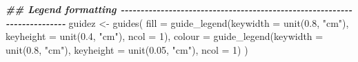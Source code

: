 \documentclass[
]{article}
\newenvironment{Shaded}{\begin{snugshade}}{\end{snugshade}}
\newcommand{\AttributeTok}[1]{\textcolor[rgb]{0.77,0.63,0.00}{#1}}
\newcommand{\DecValTok}[1]{\textcolor[rgb]{0.00,0.00,0.81}{#1}}
\newcommand{\DocumentationTok}[1]{\textcolor[rgb]{0.56,0.35,0.01}{\textbf{\textit{#1}}}}
\newcommand{\FloatTok}[1]{\textcolor[rgb]{0.00,0.00,0.81}{#1}}
\newcommand{\FunctionTok}[1]{\textcolor[rgb]{0.00,0.00,0.00}{#1}}
\newcommand{\NormalTok}[1]{#1}
\newcommand{\OtherTok}[1]{\textcolor[rgb]{0.56,0.35,0.01}{#1}}
\newcommand{\StringTok}[1]{\textcolor[rgb]{0.31,0.60,0.02}{#1}}
\begin{document}
\begin{Shaded}
\begin{Highlighting}[]
\DocumentationTok{\#\# Legend formatting {-}{-}{-}{-}{-}{-}{-}{-}{-}{-}{-}{-}{-}{-}{-}{-}{-}{-}{-}{-}{-}{-}{-}{-}{-}{-}{-}{-}{-}{-}{-}{-}{-}{-}{-}{-}{-}{-}{-}{-}{-}{-}{-}{-}{-}{-}{-}{-}{-}{-}{-}{-}{-}{-}{-}{-}{-}{-}{-}{-}{-}{-}{-}{-}{-}{-}{-}{-}{-}{-}{-}{-}{-}}
\NormalTok{guidez }\OtherTok{\textless{}{-}} \FunctionTok{guides}\NormalTok{(}
\AttributeTok{fill =} \FunctionTok{guide\_legend}\NormalTok{(}\AttributeTok{keywidth =} \FunctionTok{unit}\NormalTok{(}\FloatTok{0.8}\NormalTok{, }\StringTok{"cm"}\NormalTok{),}
                    \AttributeTok{keyheight =} \FunctionTok{unit}\NormalTok{(}\FloatTok{0.4}\NormalTok{, }\StringTok{"cm"}\NormalTok{), }
                    \AttributeTok{ncol =} \DecValTok{1}\NormalTok{),}
\AttributeTok{colour =} \FunctionTok{guide\_legend}\NormalTok{(}\AttributeTok{keywidth =} \FunctionTok{unit}\NormalTok{(}\FloatTok{0.8}\NormalTok{, }\StringTok{"cm"}\NormalTok{),}
                      \AttributeTok{keyheight =} \FunctionTok{unit}\NormalTok{(}\FloatTok{0.05}\NormalTok{, }\StringTok{"cm"}\NormalTok{), }
                      \AttributeTok{ncol =} \DecValTok{1}\NormalTok{)}
\NormalTok{)}



\end{Highlighting}
\end{Shaded}
\end{document}
